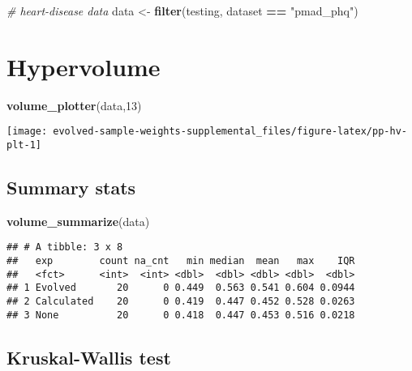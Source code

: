 \documentclass[
]{book}
\newenvironment{Shaded}{\begin{snugshade}}{\end{snugshade}}
\newcommand{\CommentTok}[1]{\textcolor[rgb]{0.56,0.35,0.01}{\textit{#1}}}
\newcommand{\DecValTok}[1]{\textcolor[rgb]{0.00,0.00,0.81}{#1}}
\newcommand{\FunctionTok}[1]{\textcolor[rgb]{0.13,0.29,0.53}{\textbf{#1}}}
\newcommand{\NormalTok}[1]{#1}
\newcommand{\OtherTok}[1]{\textcolor[rgb]{0.56,0.35,0.01}{#1}}
\newcommand{\SpecialCharTok}[1]{\textcolor[rgb]{0.81,0.36,0.00}{\textbf{#1}}}
\newcommand{\StringTok}[1]{\textcolor[rgb]{0.31,0.60,0.02}{#1}}
\begin{document}
\begin{Shaded}
\begin{Highlighting}[]
\CommentTok{\# heart{-}disease data}
\NormalTok{data }\OtherTok{\textless{}{-}} \FunctionTok{filter}\NormalTok{(testing, dataset }\SpecialCharTok{==} \StringTok{"pmad\_phq"}\NormalTok{)}
\end{Highlighting}
\end{Shaded}

\hypertarget{hypervolume-12}{%
\section{Hypervolume}\label{hypervolume-12}}

\begin{Shaded}
\begin{Highlighting}[]
\FunctionTok{volume\_plotter}\NormalTok{(data,}\DecValTok{13}\NormalTok{)}
\end{Highlighting}
\end{Shaded}

\texttt{[image: evolved-sample-weights-supplemental\_files/figure-latex/pp-hv-plt-1]}

\hypertarget{summary-stats-12}{%
\subsection{Summary stats}\label{summary-stats-12}}

\begin{Shaded}
\begin{Highlighting}[]
\FunctionTok{volume\_summarize}\NormalTok{(data)}
\end{Highlighting}
\end{Shaded}

\begin{verbatim}
## # A tibble: 3 x 8
##   exp        count na_cnt   min median  mean   max    IQR
##   <fct>      <int>  <int> <dbl>  <dbl> <dbl> <dbl>  <dbl>
## 1 Evolved       20      0 0.449  0.563 0.541 0.604 0.0944
## 2 Calculated    20      0 0.419  0.447 0.452 0.528 0.0263
## 3 None          20      0 0.418  0.447 0.453 0.516 0.0218
\end{verbatim}

\hypertarget{kruskal-wallis-test-12}{%
\subsection{Kruskal-Wallis test}\label{kruskal-wallis-test-12}}
\end{document}
